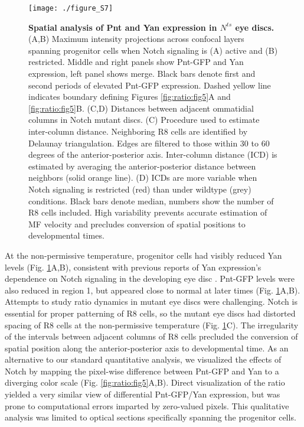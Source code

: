 \begin{figure}[h]
\centering
\texttt{[image: ./figure\_S7]}
\caption[Spatial analysis of Pnt and Yan expression in $N^{ts}$ eye discs.]{\textbf{Spatial analysis of Pnt and Yan expression in $N^{ts}$ eye discs.} (A,B) Maximum intensity projections across confocal layers spanning progenitor cells when Notch signaling is (A) active and (B) restricted. Middle and right panels show Pnt-GFP and Yan expression, left panel shows merge. Black bars denote first and second periods of elevated Pnt-GFP expression. Dashed yellow line indicates boundary defining Figures \ref{fig:ratio:fig5}A and \ref{fig:ratio:fig5}B. (C,D) Distances between adjacent ommatidial columns in Notch mutant discs. (C) Procedure used to estimate inter-column distance. Neighboring R8 cells are identified by Delaunay triangulation. Edges are filtered to those within 30 to 60 degrees of the anterior-posterior axis. Inter-column distance (ICD) is estimated by averaging the anterior-posterior distance between neighbors (solid orange line). (D) ICDs are more variable when Notch signaling is restricted (red) than under wildtype (grey) conditions. Black bars denote median, numbers show the number of R8 cells included. High variability prevents accurate estimation of MF velocity and precludes conversion of spatial positions to developmental times.}
\label{fig:ratio:figS7}
\end{figure}

At the non-permissive temperature, progenitor cells had visibly reduced Yan levels (Fig. \ref{fig:ratio:figS7}A,B), consistent with previous reports of Yan expression's dependence on Notch signaling in the developing eye disc \cite{Rohrbaugh2002}. Pnt-GFP levels were also reduced in region 1, but appeared close to normal at later times (Fig. \ref{fig:ratio:figS7}A,B). Attempts to study ratio dynamics in mutant eye discs were challenging. Notch is essential for proper patterning of R8 cells, so the mutant eye discs had distorted spacing of R8 cells at the non-permissive temperature (Fig. \ref{fig:ratio:figS7}C). The irregularity of the intervals between adjacent columns of R8 cells precluded the conversion of spatial position along the anterior-posterior axis to developmental time. As an alternative to our standard quantitative analysis, we visualized the effects of Notch by mapping the pixel-wise difference between Pnt-GFP and Yan to a diverging color scale (Fig. \ref{fig:ratio:fig5}A,B). Direct visualization of the ratio yielded a very similar view of differential Pnt-GFP/Yan expression, but was prone to computational errors imparted by zero-valued pixels. This qualitative analysis was limited to optical sections specifically spanning the progenitor cells.

